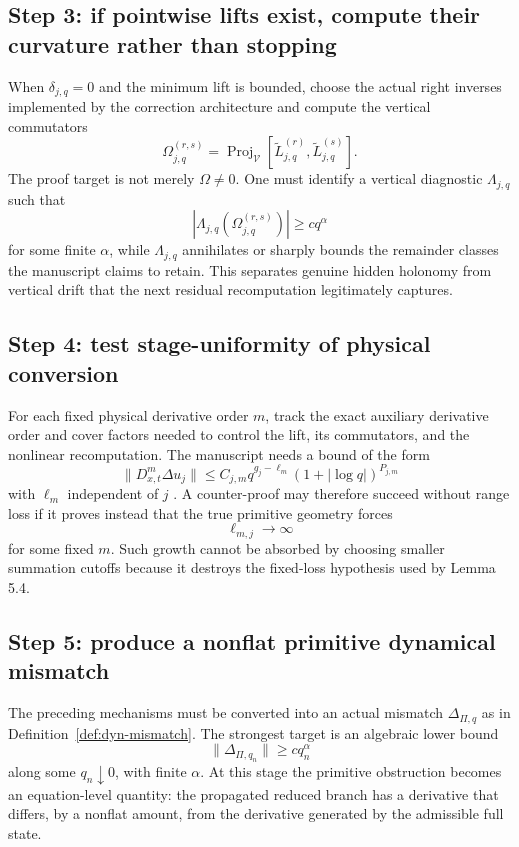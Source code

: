 \documentclass[12pt]{article}
\newcommand{\Proj}{\operatorname{Proj}}
\newcommand{\Vv}{\mathcal V}
\begin{document}
\subsection{Step 3: if pointwise lifts exist, compute their curvature rather than stopping}
When $\delta_{j,q}=0$ and the minimum lift is bounded, choose the actual right inverses implemented by the correction architecture and compute the vertical commutators
\[
\Omega_{j,q}^{(r,s)}
=\Proj_{\Vv}[\widetilde L_{j,q}^{(r)},\widetilde L_{j,q}^{(s)}].
\]
The proof target is not merely $\Omega\neq0$. One must identify a vertical diagnostic $\Lambda_{j,q}$ such that
\[
|\Lambda_{j,q}(\Omega_{j,q}^{(r,s)})|
\ge c q^\alpha
\]
for some finite $\alpha$, while $\Lambda_{j,q}$ annihilates or sharply bounds the remainder classes the manuscript claims to retain. This separates genuine hidden holonomy from vertical drift that the next residual recomputation legitimately captures.

\subsection{Step 4: test stage-uniformity of physical conversion}
For each fixed physical derivative order $m$, track the exact auxiliary derivative order and cover factors needed to control the lift, its commutators, and the nonlinear recomputation. The manuscript needs a bound of the form
\[
\|D_{x,t}^m\Delta u_j\|
\le C_{j,m}q^{g_j-\ell_m}(1+|\log q|)^{P_{j,m}}
\]
with $\ell_m$ independent of $j$ \cite[Lemma 9.8]{OpenAI2026}. A counter-proof may therefore succeed without range loss if it proves instead that the true primitive geometry forces
\[
\ell_{m,j}\to\infty
\]
for some fixed $m$. Such growth cannot be absorbed by choosing smaller summation cutoffs because it destroys the fixed-loss hypothesis used by Lemma 5.4.

\subsection{Step 5: produce a nonflat primitive dynamical mismatch}
The preceding mechanisms must be converted into an actual mismatch $\Delta_{\Pi,q}$ as in Definition~\ref{def:dyn-mismatch}. The strongest target is an algebraic lower bound
\[
\|\Delta_{\Pi,q_n}\|\ge c q_n^\alpha
\]
along some $q_n\downarrow0$, with finite $\alpha$. At this stage the primitive obstruction becomes an equation-level quantity: the propagated reduced branch has a derivative that differs, by a nonflat amount, from the derivative generated by the admissible full state.
\end{document}
